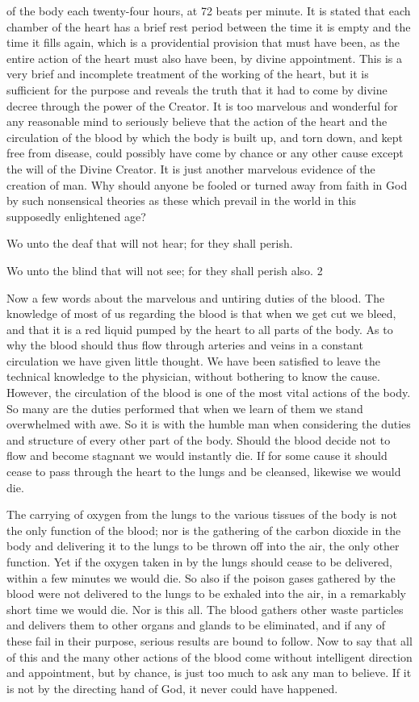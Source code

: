 of the body each twenty-four hours, at 72 beats per minute. It is stated that each chamber of
the heart has a brief rest period between the time it is empty and the time it fills again, which
is a providential provision that must have been, as the entire action of the heart must also
have been, by divine appointment. This is a very brief and incomplete treatment of the
working of the heart, but it is sufficient for the purpose and reveals the truth that it had to
come by divine decree through the power of the Creator. It is too marvelous and wonderful
for any reasonable mind to seriously believe that the action of the heart and the circulation of
the blood by which the body is built up, and torn down, and kept free from disease, could
possibly have come by chance or any other cause except the will of the Divine Creator. It is
just another marvelous evidence of the creation of man. Why should anyone be fooled or
turned away from faith in God by such nonsensical theories as these which prevail in the
world in this supposedly enlightened age?

Wo unto the deaf that will not hear; for they shall perish.

Wo unto the blind that will not see; for they shall perish also. 2

Now a few words about the marvelous and untiring duties of the blood. The knowledge of
most of us regarding the blood is that when we get cut we bleed, and that it is a red liquid
pumped by the heart to all parts of the body. As to why the blood should thus flow through
arteries and veins in a constant circulation we have given little thought. We have been
satisfied to leave the technical knowledge to the physician, without bothering to know the
cause. However, the circulation of the blood is one of the most vital actions of the body. So
many are the duties performed that when we learn of them we stand overwhelmed with awe.
So it is with the humble man when considering the duties and structure of every other part of
the body. Should the blood decide not to flow and become stagnant we would instantly die. If
for some cause it should cease to pass through the heart to the lungs and be cleansed,
likewise we would die.

The carrying of oxygen from the lungs to the various tissues of the body is not the only
function of the blood; nor is the gathering of the carbon dioxide in the body and delivering it
to the lungs to be thrown off into the air, the only other function. Yet if the oxygen taken in
by the lungs should cease to be delivered, within a few minutes we would die. So also if the
poison gases gathered by the blood were not delivered to the lungs to be exhaled into the air,
in a remarkably short time we would die. Nor is this all. The blood gathers other waste
particles and delivers them to other organs and glands to be eliminated, and if any of these
fail in their purpose, serious results are bound to follow. Now to say that all of this and the
many other actions of the blood come without intelligent direction and appointment, but by
chance, is just too much to ask any man to believe. If it is not by the directing hand of God, it
never could have happened.

